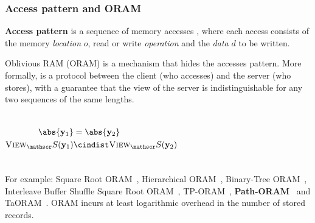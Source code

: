 	\begin{frame}[label={frame:appendix:oram}]

		\frametitle{Access pattern and ORAM}

		\justifying%

		\textbf{Access pattern} is a sequence of memory accesses \oramProgram{}, where each access consists of the memory \emph{location} $o$, read \oramRead{} or write \oramWrite{} \emph{operation} and the \emph{data} $d$ to be written.

		Oblivious RAM (ORAM) is a mechanism that hides the accesses pattern.
		More formally, \oram{} is a protocol between the client \client{} (who accesses) and the server \server{} (who stores), with a guarantee that the view of the server is indistinguishable for any two sequences of the same lengths.

		\begin{columns}[T]

				\[
					\begin{split}
						\abs{\oramProgram_1}					& = \abs{\oramProgram_2}							\\
						\textsc{View}_\server (\oramProgram_1)	& \cindist \textsc{View}_\server (\oramProgram_2)
					\end{split}
				\]



		\end{columns}

		\vspace*{1ex}

		For example: Square Root ORAM~\cite{oram-theory}, Hierarchical ORAM~\cite{oram-original}, Binary-Tree ORAM~\cite{binary-tree-oram}, Interleave Buffer Shuffle Square Root ORAM~\cite{shortest-path-oram}, TP-ORAM~\cite{tp-oram}, \textbf{Path-ORAM}~\cite{path-oram} and TaORAM~\cite{taostore}.
		\alert{ORAM incurs at least logarithmic overhead in the number of stored records.~\cite{oram-original}}
		\hyperlink{frame:epsolute-motivation}{}

	\end{frame}

